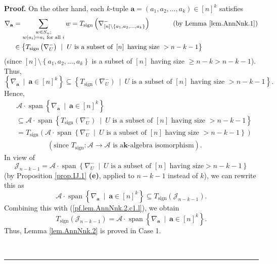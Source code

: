 \documentclass[numbers=enddot,12pt,final,onecolumn,notitlepage]{scrartcl}%
\numberwithin{exer}{subsection}
\theoremstyle{definition}
\newenvironment{proof}[1][Proof]{\noindent\textbf{#1.} }{\ \rule{0.5em}{0.5em}}
\let\sumnonlimits\sum
\renewcommand{\sum}{\sumnonlimits\limits}
\begin{document}
\begin{proof}
On the other hand, each $k$-tuple $\mathbf{a}=\left(  a_{1},a_{2},\ldots
,a_{k}\right)  \in\left[  n\right]  ^{k}$ satisfies%
\begin{align*}
\nabla_{\mathbf{a}}  &  =\sum_{\substack{w\in S_{n};\\w\left(  a_{i}\right)
=a_{i}\text{ for all }i}}w=T_{\operatorname*{sign}}\left(  \nabla_{\left[
n\right]  \setminus\left\{  a_{1},a_{2},\ldots,a_{k}\right\}  }^{-}\right)
\ \ \ \ \ \ \ \ \ \ \left(  \text{by Lemma \ref{lem.AnnNnk.1}}\right) \\
&  \in\left\{  T_{\operatorname*{sign}}\left(  \nabla_{U}^{-}\right)
\ \mid\ U\text{ is a subset of }\left[  n\right]  \text{ having size
}>n-k-1\right\}
\end{align*}
(since $\left[  n\right]  \setminus\left\{  a_{1},a_{2},\ldots,a_{k}\right\}
$ is a subset of $\left[  n\right]  $ having size $\geq n-k>n-k-1$). Thus,%
\[
\left\{  \nabla_{\mathbf{a}}\ \mid\ \mathbf{a}\in\left[  n\right]
^{k}\right\}  \subseteq\left\{  T_{\operatorname*{sign}}\left(  \nabla_{U}%
^{-}\right)  \ \mid\ U\text{ is a subset of }\left[  n\right]  \text{ having
size }>n-k-1\right\}  .
\]
Hence,%
\begin{align*}
&  \mathcal{A}\cdot\operatorname*{span}\left\{  \nabla_{\mathbf{a}}%
\ \mid\ \mathbf{a}\in\left[  n\right]  ^{k}\right\} \\
&  \subseteq\mathcal{A}\cdot\operatorname*{span}\left\{
T_{\operatorname*{sign}}\left(  \nabla_{U}^{-}\right)  \ \mid\ U\text{ is a
subset of }\left[  n\right]  \text{ having size }>n-k-1\right\} \\
&  =T_{\operatorname*{sign}}\left(  \mathcal{A}\cdot\operatorname*{span}%
\left\{  \nabla_{U}^{-}\ \mid\ U\text{ is a subset of }\left[  n\right]
\text{ having size }>n-k-1\right\}  \right) \\
&  \ \ \ \ \ \ \ \ \ \ \ \ \ \ \ \ \ \ \ \ \left(  \text{since }%
T_{\operatorname*{sign}}:\mathcal{A}\rightarrow\mathcal{A}\text{ is a
}\mathbf{k}\text{-algebra isomorphism}\right)  .
\end{align*}
In view of%
\[
\mathcal{J}_{n-k-1}=\mathcal{A}\cdot\operatorname*{span}\left\{  \nabla
_{U}^{-}\ \mid\ U\text{ is a subset of }\left[  n\right]  \text{ having size
}>n-k-1\right\}
\]
(by Proposition \ref{prop.IJ.1} \textbf{(e)}, applied to $n-k-1$ instead of
$k$), we can rewrite this as%
\[
\mathcal{A}\cdot\operatorname*{span}\left\{  \nabla_{\mathbf{a}}%
\ \mid\ \mathbf{a}\in\left[  n\right]  ^{k}\right\}  \subseteq
T_{\operatorname*{sign}}\left(  \mathcal{J}_{n-k-1}\right)  .
\]
Combining this with (\ref{pf.lem.AnnNnk.2.c1.l}), we obtain%
\[
T_{\operatorname*{sign}}\left(  \mathcal{J}_{n-k-1}\right)  =\mathcal{A}%
\cdot\operatorname*{span}\left\{  \nabla_{\mathbf{a}}\ \mid\ \mathbf{a}%
\in\left[  n\right]  ^{k}\right\}  .
\]
Thus, Lemma \ref{lem.AnnNnk.2} is proved in Case 1.


\end{proof}
\end{document}
